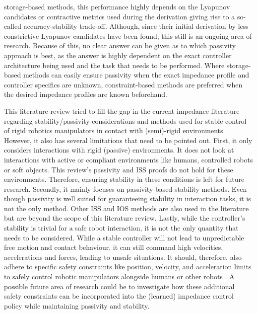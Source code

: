 storage-based methods, this performance highly depends on the Lyapunov candidates or contractive metrics used during the derivation giving rise to a so-called accuracy-stability trade-off. Although, since their initial derivation by \cite{kronanderStabilityConsiderationsVariable2016} less constrictive Lyapunov candidates have been found, this still is an ongoing area of research. Because of this, no clear answer can be given as to which passivity approach is best, as the answer is highly dependent on the exact controller architecture being used and the task that needs to be performed. Where storage-based methods can easily ensure passivity when the exact impedance profile and controller specifics are unknown, constraint-based methods are preferred when the desired impedance profiles are known beforehand.

This literature review tried to fill the gap in the current impedance literature regarding stability/passivity considerations and methods used for stable control of rigid robotics manipulators in contact with (semi)-rigid environments. However, it also has several limitations that need to be pointed out. First, it only considers interactions with rigid (passive) environments. It does not look at interactions with active or compliant environments like humans, controlled robots or soft objects. This review's passivity and ISS proofs do not hold for these environments. Therefore, ensuring stability in these conditions is left for future research. Secondly, it mainly focuses on passivity-based stability methods. Even though passivity is well suited for guaranteeing stability in interaction tasks, it is not the only method. Other ISS and IOS methods are also used in the literature but are beyond the scope of this literature review. Lastly, while the controller's stability is trivial for a safe robot interaction, it is not the only quantity that needs to be considered. While a stable controller will not lead to unpredictable free motion and contact behaviour, it can still command high velocities, accelerations and forces, leading to unsafe situations. It should, therefore, also adhere to specific safety constraints like position, velocity, and acceleration limits to safely control robotic manipulators alongside humans or other robots \cite{lasotaSurveyMethodsSafe2017,chowLyapunovbasedApproachSafe2018,sadanandananandSafeLearningControl2021,sharkawyHumanRobotInteraction2022}. A possible future area of research could be to investigate how these additional safety constraints can be incorporated into the (learned) impedance control policy while maintaining passivity and stability.
